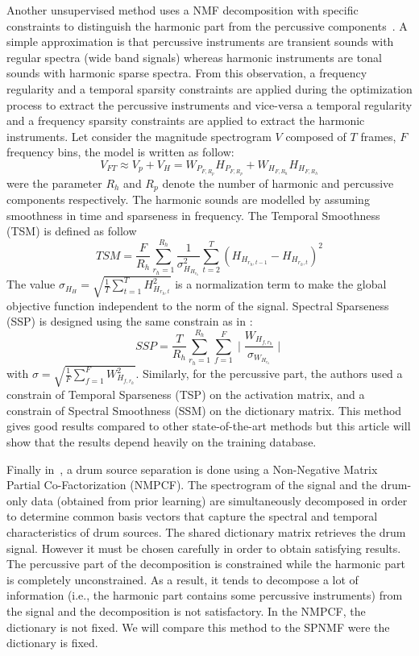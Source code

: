 Another unsupervised method uses a NMF decomposition with specific constraints to distinguish the harmonic part from the percussive components~\cite{canadas2014percussive}. A simple approximation is that percussive instruments are transient sounds with regular spectra (wide band signals) whereas harmonic instruments are tonal sounds with harmonic sparse spectra. From this observation, a frequency regularity and a temporal sparsity constraints are applied during the optimization process to extract the percussive instruments and vice-versa a temporal regularity and a frequency sparsity constraints are applied to extract the harmonic instruments. Let consider the magnitude spectrogram $V$ composed of $T$ frames, $F$ frequency bins, the model is written as follow:
$$ V_{FT} \approx V_p + V_H = W_{P_{F,R_p}} H_{P_{F,R_p}} + W_{H_{F,R_h}} H_{H_{F,R_h}} $$
were the parameter $R_h$ and $R_p$ denote the number of harmonic and percussive components respectively. The harmonic sounds are modelled by assuming smoothness in time and sparseness in frequency. The Temporal Smoothness (TSM) is defined as follow 
\begin{equation}
TSM = \frac{F}{R_h} \sum_{r_h=1}^{R_h}\frac{1}{\sigma_{H_{H_{r_h}}}^2} \sum_{t=2}^{T}(H_{H_{r_h,t-1}} - H_{H_{r_h,t}})^2
\end{equation}
The value $\sigma_{H_{H}} = \sqrt{\frac{1}{T} \sum_{t=1}^{T} H_{H_{r_h,t}}^2 }$ is a normalization term to make the global objective function independent to the norm of the signal. Spectral Sparseness (SSP) is designed using the same constrain as in \cite{Virtanen}:
\begin{equation}
SSP = \frac{T}{R_h} \sum_{r_h=1}^{R_h}\sum_{f=1}^{F} \mid\frac{W_{H_{f,r_h}}}{\sigma_{W_{H_{r_h}}}}\mid
\end{equation}
with $\sigma = \sqrt{\frac{1}{F} \sum_{f=1}^{F} W_{H_{f,r_h}}^2 }$.
Similarly, for the percussive part, the authors used a constrain of Temporal Sparseness (TSP) on the activation matrix, and a constrain of Spectral Smoothness (SSM) on the dictionary matrix. 
This method gives good results compared to other state-of-the-art methods but this article will show that the results depend heavily on the training database.

Finally in~\cite{kim2011nonnegative}, a drum source separation is done using a Non-Negative Matrix Partial Co-Factorization (NMPCF). The spectrogram of the signal and the drum-only data (obtained from prior learning) are simultaneously decomposed in order to determine common basis vectors that capture the spectral and temporal characteristics of drum sources. The shared dictionary matrix retrieves the drum signal. However it must be chosen carefully in order to obtain satisfying results. The percussive part of the decomposition is constrained while the harmonic part is completely unconstrained. As a result, it tends to decompose a lot of information (i.e., the harmonic part contains some percussive instruments) from the signal and the decomposition is not satisfactory. In the NMPCF, the dictionary is not fixed. We will compare this method to the SPNMF were the dictionary is fixed. 
